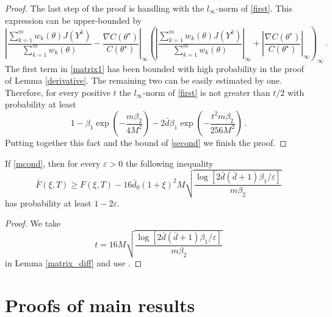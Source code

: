 \documentclass[twoside,11pt]{article}
\def\th{\theta}
\def\ths{\th^\star}
\def\grad{\nabla}
\def\bbd{\bar{d}}
\def\bd0{\bar{d} _0}
\def\ef{F(\xi,T)}
\def\bef{\bar{F}(\xi,T)}
\begin{document}
\begin{proof}
The last step of the proof is handling with the $l_\infty$-norm of \eqref{first}. This expression can be upper-bounded by 
\begin{equation}
\label{matrix1}
\left|\frac{\sum\limits_{k=1}^{m} w_k(\th) J(Y^k)}
                 {\sum\limits_{k=1}^{m} w_k(\th) } 
- \frac{\grad C(\ths)}
                 { C(\ths)}\right| _\infty 
\left(\left|\frac{\sum\limits_{k=1}^{m} w_k(\th) J(Y^k)}
                 {\sum\limits_{k=1}^{m} w_k(\th) } \right| _\infty
+ \left|\frac{\grad C(\ths)}
                 { C(\ths)}\right| _\infty 
\right) _\infty\, .
\end{equation}
The first term in \eqref{matrix1} has been bounded with high probability in the proof of 
Lemma \ref{derivative}. The remaining two can be easily estimated by one. Therefore, for every positive $t$  the $l_\infty$-norm of \eqref{first} is not greater than $t/2$ with probability at least 
\[
1-\beta_1 \exp \left(  -  \frac{m \beta_2  }{4 M^2}                     \right)  -2 \bbd  \beta_1 \exp \left(  -  \frac{ t^2 m \beta_2  }{256 M^2} \right)\, . 
\]
 Putting together this fact and the bound of \eqref{second} we finish the proof.
\end{proof}

\begin{corollary}
\label{Fdiff}
If \eqref{mcond}, then for every $\varepsilon>0$  the following inequality 
\[
\bef \geq \ef 
-  16 \bd0 (1+\xi)^2 M  \sqrt{  \frac{\log\left[2 \bbd (\bbd+1)\beta_1 /\varepsilon\right]}{m\beta_2}
}
\]
has probability at least $1-2 \varepsilon.$
\end{corollary}

\begin{proof} We take 
\[t= 16M  \sqrt{  \frac{\log\left[2 \bbd (\bbd+1)\beta_1 /\varepsilon\right]}{m\beta_2}
}
\]
in Lemma \ref{matrix_diff} and use \citet[Lemma 4.1 (ii)]{Cox13}.  
\end{proof}

\section{Proofs of main results}

\label{proofsmain}
\end{document}
